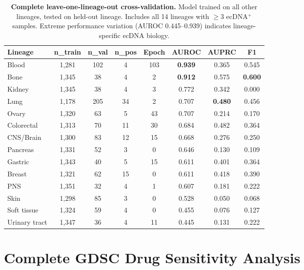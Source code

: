 \documentclass{article}
\begin{document}
\begin{table}[H]
\caption{\textbf{Complete leave-one-lineage-out cross-validation.} Model trained on all other lineages, tested on held-out lineage. Includes all 14 lineages with $\geq$3 ecDNA$^+$ samples. Extreme performance variation (AUROC 0.445--0.939) indicates lineage-specific ecDNA biology.}
\label{tab:loocv_main}
\centering
\small
\begin{tabular}{@{}lccccccc@{}}
\toprule
Lineage & n\_train & n\_val & n\_pos & Epoch & AUROC & AUPRC & F1 \\
\midrule
Blood & 1,281 & 102 & 4 & 103 & \textbf{0.939} & 0.365 & 0.545 \\
Bone & 1,345 & 38 & 4 & 2 & \textbf{0.912} & 0.575 & \textbf{0.600} \\
Kidney & 1,345 & 38 & 4 & 3 & 0.772 & 0.342 & 0.000 \\
Lung & 1,178 & 205 & 34 & 2 & 0.707 & \textbf{0.480} & 0.456 \\
Ovary & 1,320 & 63 & 5 & 43 & 0.707 & 0.214 & 0.170 \\
Colorectal & 1,313 & 70 & 11 & 30 & 0.684 & 0.482 & 0.364 \\
CNS/Brain & 1,300 & 83 & 12 & 15 & 0.668 & 0.276 & 0.250 \\
Pancreas & 1,331 & 52 & 3 & 0 & 0.646 & 0.130 & 0.109 \\
Gastric & 1,343 & 40 & 5 & 15 & 0.611 & 0.401 & 0.364 \\
Breast & 1,321 & 62 & 15 & 0 & 0.611 & 0.418 & 0.390 \\
PNS & 1,351 & 32 & 4 & 1 & 0.607 & 0.181 & 0.222 \\
Skin & 1,298 & 85 & 3 & 0 & 0.528 & 0.050 & 0.068 \\
Soft tissue & 1,324 & 59 & 4 & 0 & 0.455 & 0.076 & 0.127 \\
Urinary tract & 1,347 & 36 & 4 & 11 & 0.445 & 0.131 & 0.222 \\
\bottomrule
\end{tabular}
\end{table}


\section{Complete GDSC Drug Sensitivity Analysis}
\label{app:gdsc}
\end{document}
